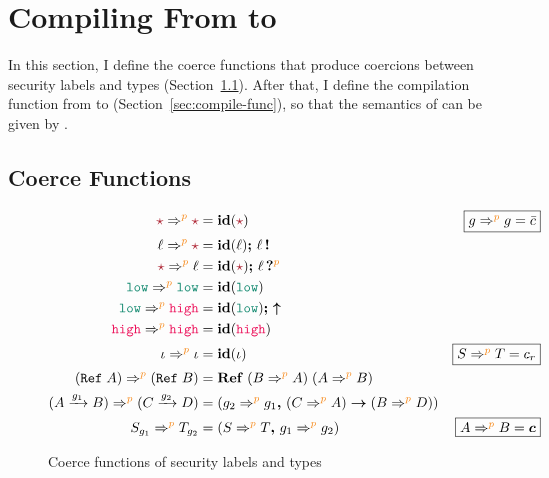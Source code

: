 \chapter{Compiling From \Surface to \CC}
\label{ch:compile}


In this section, I define the coerce functions that produce coercions between
security labels and types (Section~\ref{sec:coerce-func}). After that, I define
the compilation function from \Surface to \CC (Section~\ref{sec:compile-func}),
so that the semantics of \Surface can be given by \CC.


\section{Coerce Functions}
\label{sec:coerce-func}

\begin{figure}[tbp]
  \raggedright
  \begin{align*}
    \unk \Rightarrow^{\bl{p}} \unk &= \id{\unk} & \fbox{$g\Rightarrow^{\bl{p}}g=\bar{c}$} \\
    \ell \Rightarrow^{\bl{p}} \unk &= \id{\ell} \seq \inj{\ell} \\
    \unk \Rightarrow^{\bl{p}} \ell &= \id{\unk} \seq \proj{\ell}{\bl{p}} \\
    \low \Rightarrow^{\bl{p}} \low &= \id{\low} \\
    \low \Rightarrow^{\bl{p}} \high &= \id{\low} \seq \up \\
    \high \Rightarrow^{\bl{p}} \high &= \id{\high} \\
    \iota \Rightarrow^{\bl{p}} \iota &= \id{\iota} & \fbox{$S \Rightarrow^{\bl{p}} T = c_r$} \\
    (\Refer{A}) \Rightarrow^{\bl{p}} (\Refer{B}) &= \refco{(B \Rightarrow^{\bl{p}} A)}{(A \Rightarrow^{\bl{p}} B)} \\
    (\Fun{A}{g_1}{B}) \Rightarrow^{\bl{p}} (\Fun{C}{g_2}{D}) &= (\funco{g_2 \Rightarrow^{\bl{p}} g_1}{(C \Rightarrow^{\bl{p}} A)}{(B \Rightarrow^{\bl{p}} D)}) \\
    S_{g_1} \Rightarrow^{\bl{p}} T_{g_2} &= (\coerc{S \Rightarrow^{\bl{p}} T}{g_1 \Rightarrow^{\bl{p}} g_2}) & \fbox{$A \Rightarrow^{\bl{p}} B = \bm{c}$}
  \end{align*}
  \caption{Coerce functions of security labels and types}
  \label{fig:coerce}
\end{figure}

